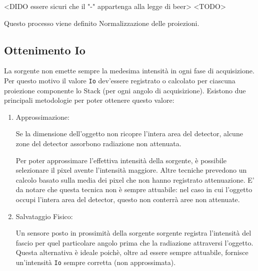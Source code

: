 \documentclass[a4paper,11pt, oneside]{article}
\begin{document}
                    <DIDO essere sicuri che il "-" appartenga alla legge di beer> <TODO>
                    
                    Questo processo viene definito Normalizzazione delle proiezioni.
                
            \subsection{Ottenimento Io}
                \label{sub:io}
                \par
                    La sorgente non emette sempre la medesima intensità in ogni fase di acquisizione. Per questo motivo il valore \texttt{Io} dev'essere registrato o calcolato per ciascuna proiezione componente lo Stack (per ogni angolo di acquisizione).
                    Esistono due principali metodologie per poter ottenere questo valore:
               
                    \begin{enumerate}
                        \item Approssimazione:
                            \par
                                Se la dimensione dell'oggetto non ricopre l'intera area del detector, alcune zone del detector assorbono radiazione non attenuata.
                                
                                Per poter approssimare l'effettiva intensità della sorgente, è possibile selezionare il pixel avente l'intensità maggiore. Altre tecniche prevedono un calcolo basato sulla media dei pixel che non hanno registrato attenuazione.
                                E' da notare che questa tecnica non è sempre attuabile: nel caso in cui l'oggetto occupi l'intera area del detector, questo non conterrà aree non attenuate.
                        
                        \item Salvataggio Fisico:
                            \par
                                Un sensore posto in prossimità della sorgente sorgente registra l'intensità del fascio per quel particolare angolo prima che la radiazione attraversi l'oggetto. Questa alternativa è ideale poichè, oltre ad essere sempre attuabile, fornisce un'intensità \texttt{Io} sempre corretta (non approssimata).
                    \end{enumerate}                
                
\end{document}
